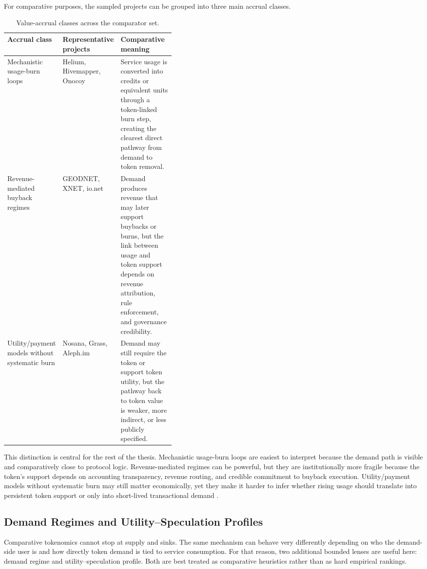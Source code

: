 For comparative purposes, the sampled projects can be grouped into three main accrual classes.

\begin{table}[H]
    \centering
    \small
    \renewcommand{\arraystretch}{1.25}
    \begin{tabularx}{\textwidth}{@{}>{\raggedright\arraybackslash}p{0.20\linewidth} >{\raggedright\arraybackslash}p{0.20\linewidth} X@{}}
        \toprule
        \textbf{Accrual class} & \textbf{Representative projects} & \textbf{Comparative meaning} \\
        \midrule
        Mechanistic usage-burn loops & Helium, Hivemapper, Onocoy & Service usage is converted into credits or equivalent units through a token-linked burn step, creating the clearest direct pathway from demand to token removal. \\
        \midrule
        Revenue-mediated buyback regimes & GEODNET, XNET, io.net & Demand produces revenue that may later support buybacks or burns, but the link between usage and token support depends on revenue attribution, rule enforcement, and governance credibility. \\
        \midrule
        Utility/payment models without systematic burn & Nosana, Grass, Aleph.im & Demand may still require the token or support token utility, but the pathway back to token value is weaker, more indirect, or less publicly specified. \\
        \bottomrule
    \end{tabularx}
    \caption[Value-accrual classes]{Value-accrual classes across the comparator set.}
    \label{tab:v2_value_accrual}
\end{table}

This distinction is central for the rest of the thesis. Mechanistic usage-burn loops are easiest to interpret because the demand path is visible and comparatively close to protocol logic. Revenue-mediated regimes can be powerful, but they are institutionally more fragile because the token’s support depends on accounting transparency, revenue routing, and credible commitment to buyback execution. Utility/payment models without systematic burn may still matter economically, yet they make it harder to infer whether rising usage should translate into persistent token support or only into short-lived transactional demand \cite{RenderBME, GeodnetIP7, IoNet2025, OnocoyWhitepaper301, OnocoyToken}.

\subsection{Demand Regimes and Utility--Speculation Profiles}
Comparative tokenomics cannot stop at supply and sinks. The same mechanism can behave very differently depending on who the demand-side user is and how directly token demand is tied to service consumption. For that reason, two additional bounded lenses are useful here: demand regime and utility--speculation profile. Both are best treated as comparative heuristics rather than as hard empirical rankings.

